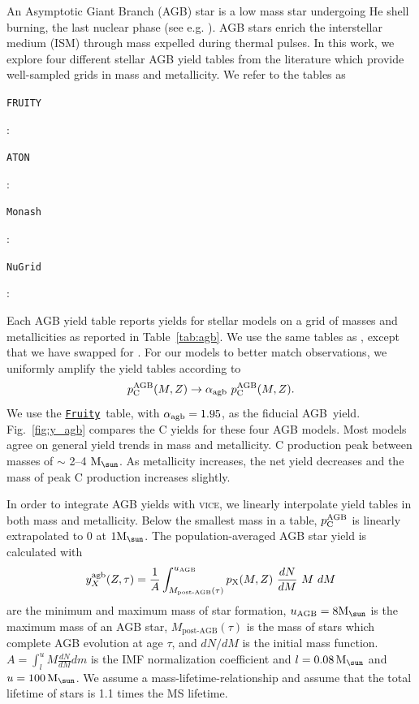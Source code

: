 \documentclass[fleqn,
usenatbib]{mnras}
\newcommand{\VICE}{\textsc{vice}}
\newcommand{\fruity}{\texttt{\hyperlink{fruity}{Fruity}}}
\newcommand{\cfactor}{1.95}
\newcommand{\agb}{AGB}
\newcommand{\ycagb}{\y_{\rm C}^{\rm AGB}}
\newcommand{\y}{p}
\newcommand{\Mo}{ {\rm M}_{\sun}}
\begin{document}
An Asymptotic Giant Branch (AGB) star is a low mass star undergoing He shell burning, the last nuclear phase (see e.g. \citealt{PR2023}). AGB stars enrich the interstellar medium (ISM) through mass expelled during thermal pulses. 
In this work, we explore four different stellar AGB yield tables from the literature which provide well-sampled grids in mass and metallicity. We refer to the tables as 
\begin{description}
    \item \hypertarget{fruity}{\texttt{FRUITY}}: \citet{cristallo+11, cristallo+15}
    \item \hypertarget{aton}{\texttt{ATON}}: \citet{ventura+13,ventura+14,ventura+18, ventura+20}
    \item \hypertarget{monash}{\texttt{Monash}}: \citet{KL16, karakas+18}
    \item \hypertarget{nugrid}{\texttt{NuGrid}}: \citet{pignatari+16, ritter+18, battino+19, battino+21}
\end{description}
Each AGB yield table reports yields for stellar models on a grid of masses and metallicities as reported in Table~\ref{tab:agb}.
We use the same tables as \citet{james+23}, except that we have swapped \citet{karakas10} for \citet{pignatari+16}. 
For our models to better match observations, we uniformly amplify the yield tables according to
\begin{equation} \label{eq:alpha}
        \ycagb(M, Z) \rightarrow \alpha_{\rm agb}\ \ycagb(M, Z).
\end{equation}
We use the \fruity\ table, with $\alpha_{\rm agb}=\cfactor$, as the fiducial \agb\ yield.
Fig.~\ref{fig:y_agb} compares the C yields for these four AGB models.
Most models agree on general yield trends in mass and metallicity.
C production peak between masses of $\sim$ 2--4 $\Mo$. As metallicity increases, the net yield decreases and the mass of peak C production increases slightly.


In order to integrate AGB yields with \VICE, we linearly interpolate yield tables in both mass and metallicity. Below the smallest mass in a table, $\ycagb$ is linearly extrapolated to 0 at $1\Mo$. The population-averaged AGB star yield is calculated with 
\begin{equation} \label{eq:imf-agb-yield}
    y_{X}^{\rm agb}(Z,\tau) = 
    \frac{1}{A}\int^{u_{\rm AGB}}_{M_\textrm{post-AGB}(\tau)} 
    \y_{\rm X}(M, Z)\ 
    \frac{dN}{dM}\ M\ dM
\end{equation}
are the minimum and maximum mass of star formation, $u_{\rm AGB}=8\Mo$ is the maximum mass of an AGB star, $M_\textrm{post-AGB}(\tau)$ is the mass of stars which complete AGB evolution at age $\tau$, and $dN/dM$ is the initial mass function. $A = \int_l^u M \frac{dN}{dM} dm$ is the IMF normalization coefficient and  $l=0.08\,\Mo$ and $u = 100\,\Mo$. We assume a \citet{larson74} mass-lifetime-relationship and assume that the total lifetime of stars is 1.1 times the MS lifetime.
\end{document}
